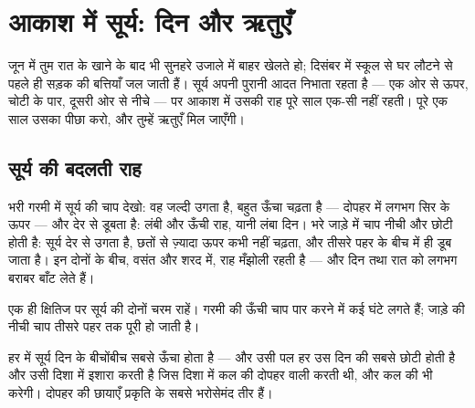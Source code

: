 \chapter{आकाश में सूर्य: दिन और ऋतुएँ}\label{ch:g3:sun-days-seasons}

जून में तुम रात के खाने के बाद भी सुनहरे उजाले में बाहर खेलते हो;
दिसंबर में स्कूल से घर लौटने से पहले ही सड़क की बत्तियाँ जल जाती हैं।
सूर्य अपनी पुरानी आदत निभाता रहता है --- एक ओर से ऊपर, चोटी के पार,
दूसरी ओर से नीचे --- पर आकाश में उसकी राह पूरे साल एक-सी नहीं रहती।
पूरे एक साल उसका पीछा करो, और तुम्हें ऋतुएँ मिल जाएँगी।

\section{सूर्य की बदलती राह}

\begin{example}[गरमी की राह, जाड़े की राह]\label{ex:g3:sun-days-seasons:roads}
भरी गरमी में सूर्य की चाप देखो: वह जल्दी उगता है, बहुत ऊँचा चढ़ता है
--- दोपहर में लगभग सिर के ऊपर --- और देर से डूबता है: लंबी और ऊँची
राह, यानी लंबा दिन। भरे जाड़े में चाप नीची और छोटी होती है: सूर्य देर
से उगता है, छतों से ज़्यादा ऊपर कभी नहीं चढ़ता, और तीसरे पहर के बीच
में ही डूब जाता है। इन दोनों के बीच, वसंत और शरद में, राह मँझोली रहती
है --- और दिन तथा रात  को लगभग बराबर बाँट लेते हैं।
\end{example}

\begin{omfigure}

{\small एक ही क्षितिज पर सूर्य की दोनों चरम राहें। गरमी की ऊँची चाप
पार करने में कई घंटे लगते हैं; जाड़े की नीची चाप तीसरे पहर तक पूरी हो
जाती है।}
\end{omfigure}

\begin{proposition}[दोपहर का नियम]\label{prop:g3:sun-days-seasons:midday}
हर  में सूर्य दिन के बीचोंबीच सबसे ऊँचा होता है --- और उसी पल हर
 उस दिन की सबसे छोटी  होती है और उसी दिशा में इशारा करती है
जिस दिशा में कल की दोपहर वाली  करती थी, और कल की भी करेगी। दोपहर
की छायाएँ प्रकृति के सबसे भरोसेमंद तीर हैं।
\end{proposition}

